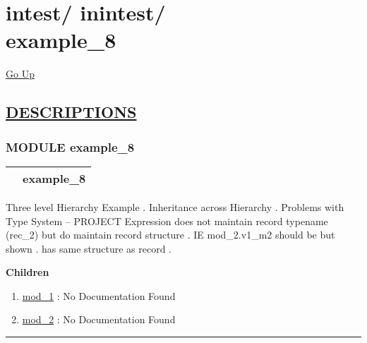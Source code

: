 \chapter*{\color{headfile}
{\large intest\slash\hspace{0pt}}
{\large inintest\slash\hspace{0pt}}
 \\
example_8
}
\hypertarget{ecldoc:toc:intest.inintest.example_8}{}
\hyperlink{ecldoc:toc:root/intest/inintest}{Go Up}


\section*{\underline{\textsf{DESCRIPTIONS}}}
\subsection*{\textsf{\colorbox{headtoc}{\color{white} MODULE}
example\_8}}

\hypertarget{ecldoc:intest.inintest.example_8}{}

{\renewcommand{\arraystretch}{1.5}
\begin{tabularx}{\textwidth}{|>{\raggedright\arraybackslash}l|X|}
\hline
\hspace{0pt}\mytexttt{\color{red} } & \textbf{example\_8} \\
\hline
\end{tabularx}
}

\par





Three level Hierarchy Example . Inheritance across Hierarchy . Problems with Type System -- PROJECT Expression does not maintain record typename (rec\_2) but do maintain record structure . IE mod\_2.v1\_m2 should be  but shown  .  has same structure as record  .







\textbf{Children}
\begin{enumerate}
\item \hyperlink{ecldoc:intest.inintest.example_8.mod_1}{mod\_1}
: No Documentation Found
\item \hyperlink{ecldoc:intest.inintest.example_8.mod_2}{mod\_2}
: No Documentation Found
\end{enumerate}

\rule{\linewidth}{0.5pt}

